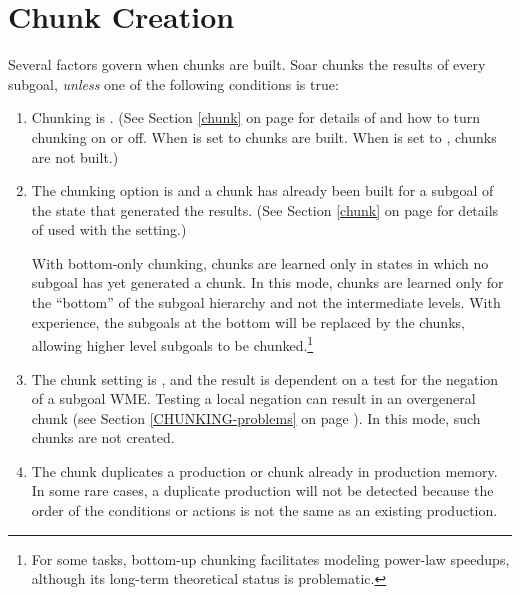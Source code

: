 \section{Chunk Creation}
\label{CHUNKING-creation}

Several factors govern when chunks are built. Soar chunks the results of every
subgoal, \emph{unless} one of the following conditions is true:

\begin{enumerate}
\item Chunking is . (See Section \ref{chunk} on page \pageref{chunk}
	for details of  and how to turn chunking on or off.
	When  is set to  chunks are built.  
	When  is set to , chunks are not built.)

\item The chunking option  is  and a chunk has
	already been built for a subgoal of the state that generated the results. 
	(See Section \ref{chunk} on page \pageref{chunk} for details of 
	 used with the  setting.) 

	With bottom-only chunking, chunks are learned only in states in which no
	subgoal has yet generated a chunk. In this mode, chunks are learned
	only for the ``bottom'' of the subgoal hierarchy and not the
	intermediate levels. With experience, the subgoals at the bottom will
	be replaced by the chunks, allowing higher level subgoals to be
	chunked.\footnote{For some tasks, bottom-up chunking facilitates
	modeling power-law speedups, although its long-term theoretical
	status is problematic.}
	

\item The chunk setting  is , and the
  result is dependent on a test for the negation of a subgoal WME. Testing a
  local negation can result in an overgeneral chunk (see Section
  \ref{CHUNKING-problems} on page \pageref{CHUNKING-problems}). In this mode,
  such chunks are not created.

\item The chunk duplicates a production or chunk already in production memory.
	In some rare cases, a duplicate production will not be detected because the
	order of the conditions or actions is not the same as an existing production.  


\end{enumerate}
